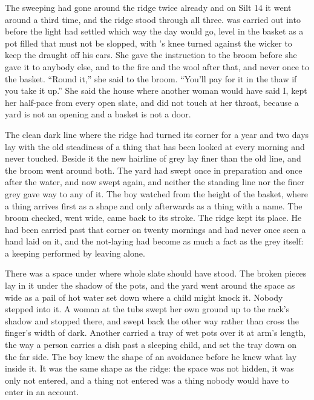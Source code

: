 
The sweeping had gone around the ridge twice already and on Silt 14 it went around a third time, and the ridge stood through all three.  was carried out into  before the light had settled which way the day would go, level in the basket as a pot filled that must not be slopped, with 's knee turned against the wicker to keep the draught off his ears. She gave the instruction to the broom before she gave it to anybody else, and to the fire and the wool after that, and never once to the basket. “Round it,” she said to the broom. “You'll pay for it in the thaw if you take it up.” She said the house where another woman would have said I, kept her half-pace from every open slate, and did not touch  at her throat, because a yard is not an opening and a basket is not a door.

The clean dark line where the  ridge had turned its corner for a year and two days lay with the old steadiness of a thing that has been looked at every morning and never touched. Beside it the new hairline of grey lay finer than the old line, and the broom went around both. The yard had swept once in preparation and once after the water, and now swept again, and neither the standing line nor the finer grey gave way to any of it. The boy watched from the height of the basket, where a thing arrives first as a shape and only afterwards as a thing with a name. The broom checked, went wide, came back to its stroke. The ridge kept its place. He had been carried past that corner on twenty mornings and had never once seen a hand laid on it, and the not-laying had become as much a fact as the grey itself: a keeping performed by leaving alone.

There was a space under  where whole slate should have stood. The broken pieces lay in it under the shadow of the pots, and the yard went around the space as wide as a pail of hot water set down where a child might knock it. Nobody stepped into it. A woman at the tubs swept her own ground up to the rack's shadow and stopped there, and swept back the other way rather than cross the finger's width of dark. Another carried a tray of wet pots over it at arm's length, the way a person carries a dish past a sleeping child, and set the tray down on the far side. The boy knew the shape of an avoidance before he knew what lay inside it. It was the same shape as the ridge: the space was not hidden, it was only not entered, and a thing not entered was a thing nobody would have to enter in an account.

